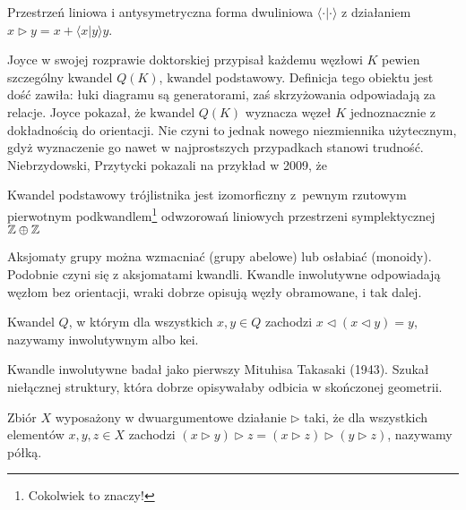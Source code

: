 \begin{example}
%
    Przestrzeń liniowa i antysymetryczna forma dwuliniowa $\langle \cdot | \cdot \rangle$ z działaniem $x \triangleright y = x + \langle x | y \rangle y$.
\end{example}

Joyce w swojej rozprawie doktorskiej przypisał każdemu węzłowi $K$ pewien szczególny kwandel $Q(K)$, kwandel podstawowy.
%
%
Definicja tego obiektu jest dość zawiła: łuki diagramu są generatorami, zaś skrzyżowania odpowiadają za relacje.
Joyce pokazał, że kwandel $Q(K)$ wyznacza węzeł $K$ jednoznacznie z dokładnością do orientacji.
Nie czyni to jednak nowego niezmiennika użytecznym, gdyż wyznaczenie go nawet w najprostszych przypadkach stanowi trudność.
Niebrzydowski, Przytycki \cite{niebrzydowski09} pokazali na przykład w 2009, że
%
%

\begin{example}
    Kwandel podstawowy trójlistnika  jest izomorficzny z~pewnym rzutowym pierwotnym podkwandlem\footnote{Cokolwiek to znaczy!} odwzorowań liniowych przestrzeni symplektycznej $\mathbb Z \oplus \mathbb Z$
\end{example}

Aksjomaty grupy można wzmacniać (grupy abelowe) lub osłabiać (monoidy).
Podobnie czyni się z aksjomatami kwandli.
Kwandle inwolutywne odpowiadają węzłom bez orientacji, wraki dobrze opisują węzły obramowane, i tak dalej.
%
%

\begin{definition}
%
%
    Kwandel $Q$, w którym dla wszystkich $x, y \in Q$ zachodzi $x \triangleleft (x \triangleleft y) = y$, nazywamy inwolutywnym albo kei.
\end{definition}

Kwandle inwolutywne badał jako pierwszy Mituhisa Takasaki (1943).
%
Szukał niełącznej struktury, która dobrze opisywałaby odbicia w skończonej geometrii.

\begin{definition}[półka]
%
    Zbiór $X$ wyposażony w dwuargumentowe działanie $\triangleright$ taki, że dla wszystkich elementów $x, y, z \in X$ zachodzi $(x \triangleright y) \triangleright z = (x \triangleright z) \triangleright (y \triangleright z)$, nazywamy półką.
\end{definition}

